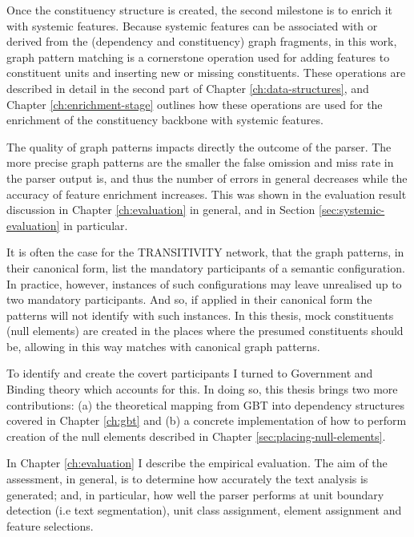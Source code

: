 
    Once the constituency structure is created, the second milestone is to enrich it with systemic features. Because systemic features can be associated with or derived from the (dependency and constituency) graph fragments, in this work, graph pattern matching is a cornerstone operation used for adding features to constituent units and inserting new or missing constituents. These operations are described in detail in the second part of Chapter \ref{ch:data-structures}, and Chapter \ref{ch:enrichment-stage} outlines how these operations are used for the enrichment of the constituency backbone with systemic features.

    The quality of graph patterns impacts directly the outcome of the parser. The more precise graph patterns are the smaller the false omission and miss rate in the parser output is, and thus the number of errors in general decreases while the accuracy of feature enrichment increases. This was shown in the evaluation result discussion in Chapter \ref{ch:evaluation} in general, and in Section \ref{sec:systemic-evaluation} in particular. 
    
    It is often the case for the TRANSITIVITY network, that the graph patterns, in their canonical form, list the mandatory participants of a semantic configuration. In practice, however, instances of such configurations may leave unrealised up to two mandatory participants. And so, if applied in their canonical form the patterns will not identify with such instances. In this thesis, mock constituents (null elements) are created in the places where the presumed constituents should be, allowing in this way matches with canonical graph patterns. 
    
    To identify and create the covert participants I turned to Government and Binding theory which accounts for this. In doing so, this thesis brings two more contributions: (a) the theoretical mapping from GBT into dependency structures covered in Chapter \ref{ch:gbt} and (b) a concrete implementation of how to perform creation of the null elements described in Chapter \ref{sec:placing-null-elements}.

    In Chapter \ref{ch:evaluation} I describe the empirical evaluation. The aim of the assessment, in general, is to determine how accurately the text analysis is generated; and, in particular, how well the parser performs at unit boundary detection (i.e text segmentation), unit class assignment, element assignment and feature selections. 
    
